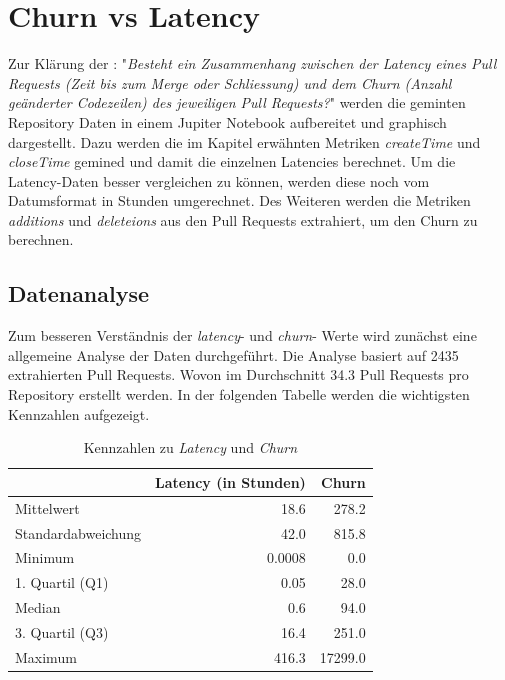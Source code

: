 \newpage
\section{Churn vs Latency}
Zur Klärung der : "\textit{Besteht ein Zusammenhang zwischen der Latency eines Pull
Requests (Zeit bis zum Merge oder Schliessung) und dem Churn (Anzahl geänderter Codezeilen) des jeweiligen Pull Requests?}" werden die geminten Repository Daten in einem Jupiter Notebook aufbereitet und graphisch dargestellt. Dazu werden die im Kapitel  erwähnten Metriken \textit{createTime} und \textit{closeTime} gemined und damit die einzelnen Latencies berechnet. Um die Latency-Daten besser vergleichen zu können, werden diese noch vom Datumsformat in Stunden umgerechnet. Des Weiteren werden die Metriken  \textit{additions} und  \textit{deleteions} aus den Pull Requests extrahiert, um den Churn zu berechnen.

\subsection{Datenanalyse}
Zum besseren Verständnis der \textit{latency}- und \textit{churn}- Werte wird zunächst eine allgemeine Analyse der Daten durchgeführt.
Die Analyse basiert auf 2435 extrahierten Pull Requests. Wovon im Durchschnitt 34.3 Pull Requests pro Repository erstellt werden. In der folgenden Tabelle werden die wichtigsten Kennzahlen aufgezeigt.


\begin{table}[htbp]
    \centering
    \caption{Kennzahlen zu \textit{Latency} und \textit{Churn}}
    \begin{tabular}{@{}lrr@{}}
        \toprule
        \textbf & \textbf{Latency (in Stunden)} & \textbf{Churn} \\
         \midrule
        Mittelwert & 18.6 & 278.2 \\
        Standardabweichung &  42.0  & 815.8 \\
        Minimum & 0.0008 & 0.0 \\
        1. Quartil (Q1) & 0.05 & 28.0 \\
        Median & 0.6 & 94.0 \\
        3. Quartil (Q3) &  16.4   & 251.0 \\
        Maximum & 416.3 & 17299.0 \\
        \bottomrule
    \end{tabular}
    \label{tab:deskriptive-kennzahlen}
\end{table}

